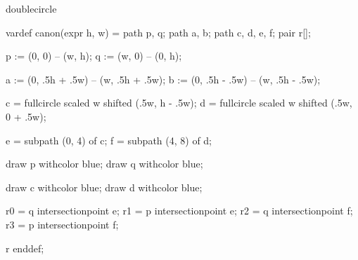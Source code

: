 

\startenvironment doublecircle

	\setuppagenumbering[alternative=singlesided]

	\startMPdefinitions
		vardef canon(expr h, w) =
			path p, q;
			path a, b;
			path c, d, e, f;
			pair r[];


			p := (0, 0) -- (w, h);
			q := (w, 0) -- (0, h);

			a := (0, .5h + .5w) -- (w, .5h + .5w); %
			b := (0, .5h - .5w) -- (w, .5h - .5w); %

			c = fullcircle scaled w shifted (.5w, h - .5w); %
			d = fullcircle scaled w shifted (.5w, 0 + .5w); %

			e = subpath (0, 4) of c; %
			f = subpath (4, 8) of d; %

			draw p withcolor blue;
			draw q withcolor blue;

			draw c withcolor blue;
			draw d withcolor blue;

			r0 = q intersectionpoint e; %
			r1 = p intersectionpoint e; %
			r2 = q intersectionpoint f; %
			r3 = p intersectionpoint f; %

			r
		enddef;
	\stopMPdefinitions

\stopenvironment


